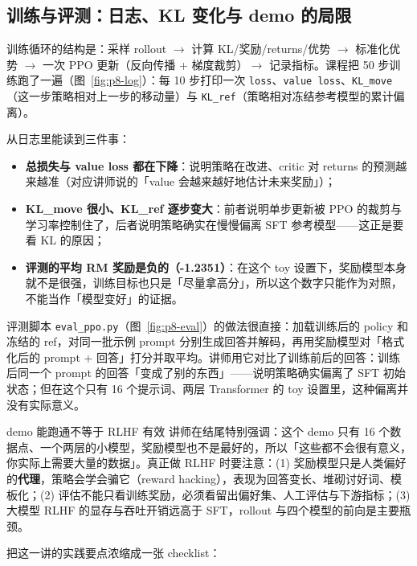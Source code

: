 \subsection{训练与评测：日志、KL 变化与 demo 的局限}

训练循环的结构是：采样 rollout $\rightarrow$ 计算 KL/奖励/returns/优势 $\rightarrow$ 标准化优势 $\rightarrow$ 一次 PPO 更新（反向传播 + 梯度裁剪）$\rightarrow$ 记录指标。课程把 50 步训练跑了一遍（图~\ref{fig:p8-log}）：每 10 步打印一次 \texttt{loss}、\texttt{value loss}、\texttt{KL\_move}（这一步策略相对上一步的移动量）与 \texttt{KL\_ref}（策略相对冻结参考模型的累计偏离）。

从日志里能读到三件事：

\begin{itemize}
\item \textbf{总损失与 value loss 都在下降}：说明策略在改进、critic 对 returns 的预测越来越准（对应讲师说的「value 会越来越好地估计未来奖励」）；
\item \textbf{KL\_move 很小、KL\_ref 逐步变大}：前者说明单步更新被 PPO 的裁剪与学习率控制住了，后者说明策略确实在慢慢偏离 SFT 参考模型——这正是要看 KL 的原因；
\item \textbf{评测的平均 RM 奖励是负的（-1.2351）}：在这个 toy 设置下，奖励模型本身就不是很强，训练目标也只是「尽量拿高分」，所以这个数字只能作为对照，不能当作「模型变好」的证据。
\end{itemize}

评测脚本 \texttt{eval\_ppo.py}（图~\ref{fig:p8-eval}）的做法很直接：加载训练后的 policy 和冻结的 ref，对同一批示例 prompt 分别生成回答并解码，再用奖励模型对「格式化后的 prompt + 回答」打分并取平均。讲师用它对比了训练前后的回答：训练后同一个 prompt 的回答「变成了别的东西」——说明策略确实偏离了 SFT 初始状态；但在这个只有 16 个提示词、两层 Transformer 的 toy 设置里，这种偏离并没有实际意义。

\begin{warningbox}{demo 能跑通不等于 RLHF 有效}
讲师在结尾特别强调：这个 demo 只有 16 个数据点、一个两层的小模型，奖励模型也不是最好的，所以「这些都不会很有意义，你实际上需要大量的数据」。真正做 RLHF 时要注意：(1) 奖励模型只是人类偏好的\textbf{代理}，策略会学会骗它（reward hacking），表现为回答变长、堆砌讨好词、模板化；(2) 评估不能只看训练奖励，必须看留出偏好集、人工评估与下游指标；(3) 大模型 RLHF 的显存与吞吐开销远高于 SFT，rollout 与四个模型的前向是主要瓶颈。
\end{warningbox}

把这一讲的实践要点浓缩成一张 checklist：

